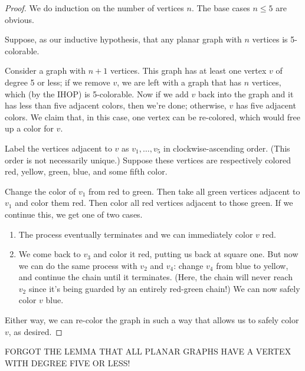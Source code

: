 \documentclass[../m55main.tex]{subfiles}
\begin{document}
\begin{proof}
    We do induction on the number of vertices $n$.
    The base cases $n \leq 5$ are obvious.

    Suppose, as our inductive hypothesis, that any planar graph with $n$ vertices is 5-colorable.

    Consider a graph with $n+1$ vertices.
    This graph has at least one vertex $v$ of degree 5 or less; if we remove $v$, we are left with a graph that has $n$ vertices, which (by the IHOP) is 5-colorable.
    Now if we add $v$ back into the graph and it has less than five adjacent colors, then we're done; otherwise, $v$ has five adjacent colors.
    We claim that, in this case, one vertex can be re-colored, which would free up a color for $v$.

    Label the vertices adjacent to $v$ as $v_1, \ldots, v_5$ in clockwise-ascending order.
    (This order is not necessarily unique.)
    Suppose these vertices are respectively colored red, yellow, green, blue, and some fifth color.

    Change the color of $v_1$ from red to green.
    Then take all green vertices adjacent to $v_1$ and color them red.
    Then color all red vertices adjacent to those green.
    If we continue this, we get one of two cases.
    \begin{enumerate}[label=(\alph*)]
        \item The process eventually terminates and we can immediately color $v$ red.
        \item We come back to $v_3$ and color it red, putting us back at square one.
        But now we can do the same process with $v_2$ and $v_4$: change $v_4$ from blue to yellow, and continue the chain until it terminates.
        (Here, the chain will never reach $v_2$ since it's being guarded by an entirely red-green chain!)
        We can now safely color $v$ blue.
    \end{enumerate}
    Either way, we can re-color the graph in such a way that allows us to safely color $v$, as desired.
\end{proof}

FORGOT THE LEMMA THAT ALL PLANAR GRAPHS HAVE A VERTEX WITH DEGREE FIVE OR LESS!
\end{document}
